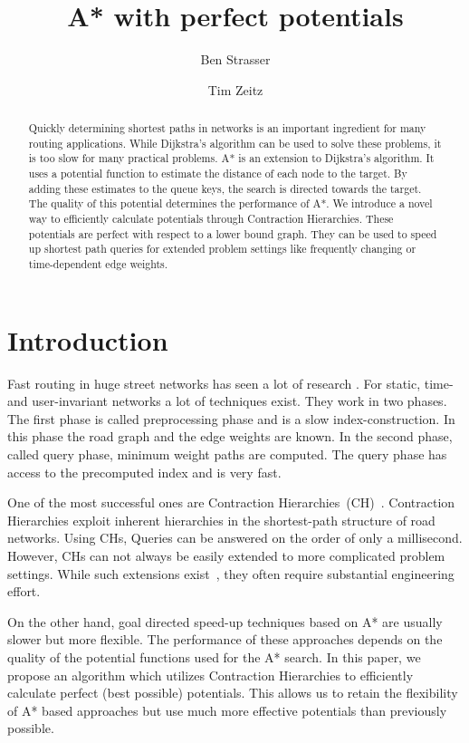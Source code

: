 \documentclass[a4paper,UKenglish,cleveref, autoref]{lipics-v2019}
\title{A* with perfect potentials} %
\author{Ben Strasser}{Germany}{academia@ben-strasser.net}{}{}%
\author{Tim Zeitz}{Institute of Theoretical Informatics, Algorithmics I, Karlsruhe Institute of Technology, Germany}{tim.zeitz@kit.edu}{}{}
\begin{document}
\maketitle

\begin{abstract}
Quickly determining shortest paths in networks is an important ingredient for many routing applications.
While Dijkstra's algorithm can be used to solve these problems, it is too slow for many practical problems.
A* is an extension to Dijkstra's algorithm.
It uses a potential function to estimate the distance of each node to the target.
By adding these estimates to the queue keys, the search is directed towards the target.
The quality of this potential determines the performance of A*.
We introduce a novel way to efficiently calculate potentials through Contraction Hierarchies.
These potentials are perfect with respect to a lower bound graph.
They can be used to speed up shortest path queries for extended problem settings like frequently changing or time-dependent edge weights.
\end{abstract}

\section{Introduction}
\label{sec:intro}

Fast routing in huge street networks has seen a lot of research \cite{bdgmpsww-rptn-16}.
For static, time- and user-invariant networks a lot of techniques exist.
They work in two phases.
The first phase is called preprocessing phase and is a slow index-construction.
In this phase the road graph and the edge weights are known.
In the second phase, called query phase, minimum weight paths are computed.
The query phase has access to the precomputed index and is very fast.

One of the most successful ones are Contraction Hierarchies~(CH)~\cite{gssv-erlrn-12}.
Contraction Hierarchies exploit inherent hierarchies in the shortest-path structure of road networks.
Using CHs, Queries can be answered on the order of only a millisecond.
However, CHs can not always be easily extended to more complicated problem settings.
While such extensions exist~\cite{dsw-cch-15,bgsv-mtdtt-13}, they often require substantial engineering effort.

On the other hand, goal directed speed-up techniques based on A* are usually slower but more flexible.
The performance of these approaches depends on the quality of the potential functions used for the A* search.
In this paper, we propose an algorithm which utilizes Contraction Hierarchies to efficiently calculate perfect (best possible) potentials.
This allows us to retain the flexibility of A* based approaches but use much more effective potentials than previously possible.
\end{document}

